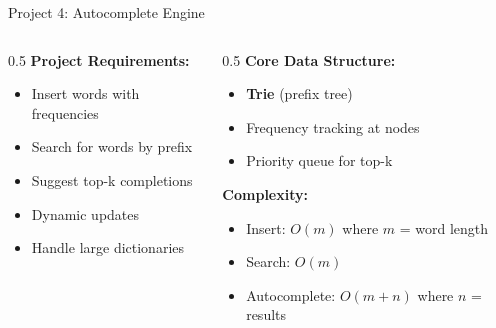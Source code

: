\documentclass[aspectratio=169,xcolor=dvipsnames]{beamer}
\begin{document}
\begin{frame}{Project 4: Autocomplete Engine}
  \begin{columns}
    \begin{column}{0.5\textwidth}
      \textbf{Project Requirements:}
      \begin{itemize}
        \item Insert words with frequencies
        \item Search for words by prefix
        \item Suggest top-k completions
        \item Dynamic updates
        \item Handle large dictionaries
      \end{itemize}
    \end{column}

    \begin{column}{0.5\textwidth}
      \textbf{Core Data Structure:}
      \begin{itemize}
        \item \textbf{Trie} (prefix tree)
        \item Frequency tracking at nodes
        \item Priority queue for top-k
      \end{itemize}

      \vspace{0.3cm}
      \textbf{Complexity:}
      \begin{itemize}
        \item Insert: $O(m)$ where $m$ = word length
        \item Search: $O(m)$
        \item Autocomplete: $O(m + n)$ where $n$ = results
      \end{itemize}
    \end{column}
  \end{columns}
\end{frame}
\end{document}
